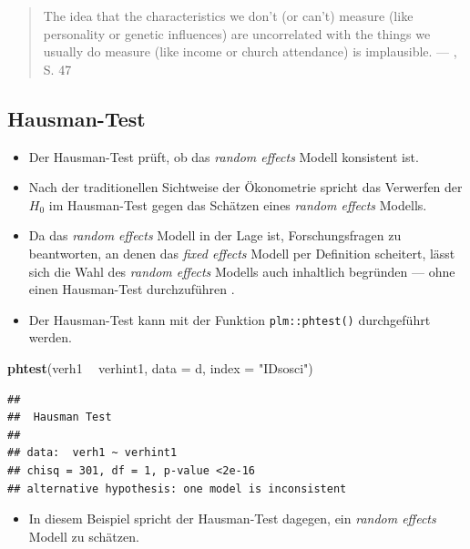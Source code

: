 \documentclass[
]{book}
\newenvironment{Shaded}{\begin{snugshade}}{\end{snugshade}}
\newcommand{\DataTypeTok}[1]{\textcolor[rgb]{0.13,0.29,0.53}{#1}}
\newcommand{\KeywordTok}[1]{\textcolor[rgb]{0.13,0.29,0.53}{\textbf{#1}}}
\newcommand{\NormalTok}[1]{#1}
\newcommand{\OperatorTok}[1]{\textcolor[rgb]{0.81,0.36,0.00}{\textbf{#1}}}
\newcommand{\StringTok}[1]{\textcolor[rgb]{0.31,0.60,0.02}{#1}}
\providecommand{\tightlist}{%
  \setlength{\itemsep}{0pt}\setlength{\parskip}{0pt}}
\begin{document}
\begin{quote}
The idea that the characteristics we don't (or can't) measure (like personality or genetic influences) are uncorrelated with the things we usually do measure (like income or church attendance) is implausible. --- \citet{vaiseyWhatYouCan2017}, S. 47
\end{quote}

\hypertarget{hausman-test}{%
\subsection*{Hausman-Test}\label{hausman-test}}

\begin{itemize}
\tightlist
\item
  Der Hausman-Test prüft, ob das \emph{random effects} Modell konsistent ist.
\item
  Nach der traditionellen Sichtweise der Ökonometrie spricht das Verwerfen der \(H_0\) im Hausman-Test gegen das Schätzen eines \emph{random effects} Modells.
\item
  Da das \emph{random effects} Modell in der Lage ist, Forschungsfragen zu beantworten, an denen das \emph{fixed effects} Modell per Definition scheitert, lässt sich die Wahl des \emph{random effects} Modells auch inhaltlich begründen --- ohne einen Hausman-Test durchzuführen \citep{bellFixedRandomEffects2019}.
\item
  Der Hausman-Test kann mit der Funktion \texttt{plm::phtest()} durchgeführt werden.
\end{itemize}

\begin{Shaded}
\begin{Highlighting}[]
\KeywordTok{phtest}\NormalTok{(verh1 }\OperatorTok{~}\StringTok{ }\NormalTok{verhint1, }\DataTypeTok{data =}\NormalTok{ d, }\DataTypeTok{index =} \StringTok{"IDsosci"}\NormalTok{)}
\end{Highlighting}
\end{Shaded}

\begin{verbatim}
## 
##  Hausman Test
## 
## data:  verh1 ~ verhint1
## chisq = 301, df = 1, p-value <2e-16
## alternative hypothesis: one model is inconsistent
\end{verbatim}

\begin{itemize}
\tightlist
\item
  In diesem Beispiel spricht der Hausman-Test dagegen, ein \emph{random effects} Modell zu schätzen.
\end{itemize}
\end{document}
